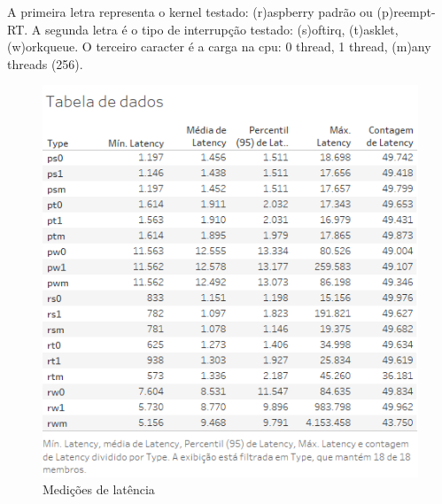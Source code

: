 A primeira letra representa o kernel testado: (r)aspberry padrão ou (p)reempt-RT.
A segunda letra é o tipo de interrupção testado: (s)oftirq, (t)asklet, (w)orkqueue.
O terceiro caracter é a carga na cpu: 0 thread, 1 thread, (m)any threads (256).

\begin{figure}[!htb]
    \centering
    \includegraphics{graficos/tableau.png}
    \caption{Medições de latência}
    \label{tableau}
\end{figure}
